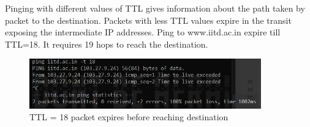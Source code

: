 \documentclass[]{assignment}
\begin{document}
\begin{alphaparts}
        Pinging with different values of TTL gives information about the path taken by packet to the destination. Packets with less TTL values expire in the transit exposing the intermediate IP addresses. Ping to www.iitd.ac.in expire till TTL=18. It requires 19 hops to reach the destination.
        \begin{figure}[hbt!]
        \centering
        \includegraphics[width=10cm]{assignment-1/report/smallping.png}
        \caption{TTL = 18 packet expires before reaching destination}
        \label{fig:galaxy}
        \end{figure}
        

\end{alphaparts}
\end{document}
